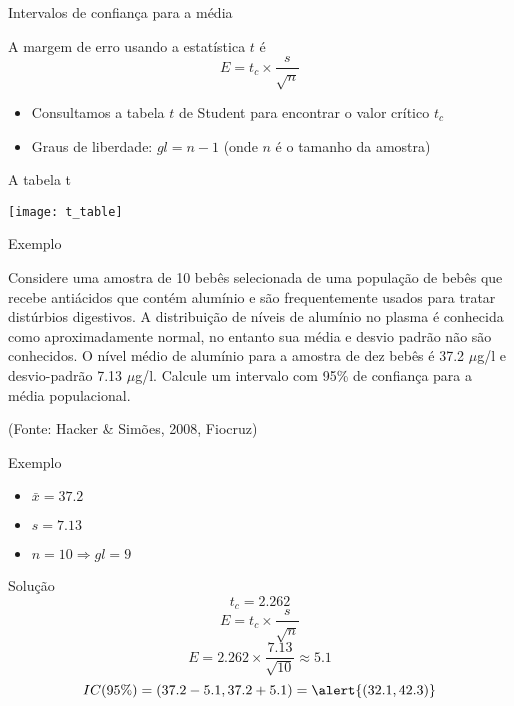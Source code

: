 \documentclass{beamer}
\begin{document}
\begin{frame}{Intervalos de confiança para a média}
  \begin{definition}
    A margem de erro usando a estatística $t$ é
    \begin{displaymath}
      E = t_c \times \frac{s}{\sqrt{n}}
    \end{displaymath}
  \end{definition}
  \begin{itemize}
  \item Consultamos a tabela $t$ de Student para encontrar o valor
    crítico $t_c$
  \item Graus de liberdade: \alert{$gl = n-1$} (onde $n$ é o tamanho da
    amostra)
  \end{itemize}
\end{frame}

\begin{frame}{A tabela t}
  \begin{center}
    \texttt{[image: t\_table]}
  \end{center}
\end{frame}

\begin{frame}{Exemplo}
  \begin{example}
    Considere uma amostra de 10 bebês selecionada de uma população de
    bebês que recebe antiácidos que contém alumínio e são
    frequentemente usados para tratar distúrbios digestivos. A
    distribuição de níveis de alumínio no plasma é conhecida como
    aproximadamente normal, no entanto sua média e desvio padrão não
    são conhecidos. O nível médio de alumínio para a amostra de dez
    bebês é 37.2 $\mu$g/l e desvio-padrão 7.13 $\mu$g/l. Calcule um
    intervalo com 95\% de confiança para a média populacional.
  \end{example}
  (Fonte: Hacker \& Simões, 2008, Fiocruz)
\end{frame}

\begin{frame}{Exemplo}
  \begin{itemize}
  \item $\bar{x}=37.2$
  \item $s=7.13$
  \item $n=10 \Rightarrow gl=9$
  \end{itemize}
  \begin{block}{Solução}
    \begin{displaymath}
      t_c = 2.262
    \end{displaymath}
    \begin{displaymath}
      E = t_c \times \frac{s}{\sqrt{n}}
    \end{displaymath}
    \begin{displaymath}
      E = 2.262 \times \frac{7.13}{\sqrt{10}} \approx 5.1
    \end{displaymath}
    \begin{displaymath}
      IC(95\%) = (37.2 - 5.1 , 37.2 + 5.1 ) = \alert{(32.1 , 42.3)}
    \end{displaymath}
  \end{block}
\end{frame}
\end{document}
